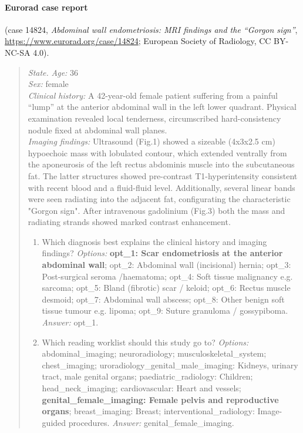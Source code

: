 \paragraph{Eurorad case report} (case 14824, \emph{Abdominal wall endometriosis: MRI findings and the “Gorgon sign”}, \url{https://www.eurorad.org/case/14824}; \textcopyright{} European Society of Radiology, CC BY-NC-SA 4.0).
\begin{quote}\footnotesize\raggedright
\textit{State.} \textit{Age:} 36\\ \textit{Sex:} female\\ \textit{Clinical history:} A 42-year-old female patient suffering from a painful “lump” at the anterior abdominal wall in the left lower quadrant. Physical examination revealed local tenderness, circumscribed hard-consistency nodule fixed at abdominal wall planes.\\ \textit{Imaging findings:} Ultrasound (Fig.1) showed a sizeable (4x3x2.5 cm) hypoechoic mass with lobulated contour, which extended ventrally from the aponeurosis of the left rectus abdominis muscle into the subcutaneous fat. The latter structures showed pre-contrast T1-hyperintensity consistent with recent blood and a fluid-fluid level. Additionally, several linear bands were seen radiating into the adjacent fat, configurating the characteristic "Gorgon sign". After intravenous gadolinium (Fig.3) both the mass and radiating strands showed marked contrast enhancement.
\begin{enumerate}[label=Q\arabic*.,leftmargin=2.2em,itemsep=1pt,topsep=2pt]
  \item Which diagnosis best explains the clinical history and imaging findings? \textit{Options:} \textbf{opt\_\allowbreak{}1: Scar endometriosis at the anterior abdominal wall}; opt\_\allowbreak{}2: Abdominal wall (incisional) hernia; opt\_\allowbreak{}3: Post-surgical seroma /haematoma; opt\_\allowbreak{}4: Soft tissue malignancy e.g. sarcoma; opt\_\allowbreak{}5: Bland (fibrotic) scar / keloid; opt\_\allowbreak{}6: Rectus muscle desmoid; opt\_\allowbreak{}7: Abdominal wall abscess; opt\_\allowbreak{}8: Other benign soft tissue tumour e.g. lipoma; opt\_\allowbreak{}9: Suture granuloma / gossypiboma. \textit{Answer:} opt\_1.
  \item Which reading worklist should this study go to? \textit{Options:} abdominal\_\allowbreak{}imaging; neuroradiology; musculoskeletal\_\allowbreak{}system; chest\_\allowbreak{}imaging; uroradiology\_\allowbreak{}genital\_\allowbreak{}male\_\allowbreak{}imaging: Kidneys, urinary tract, male genital organs; paediatric\_\allowbreak{}radiology: Children; head\_\allowbreak{}neck\_\allowbreak{}imaging; cardiovascular: Heart and vessels; \textbf{genital\_\allowbreak{}female\_\allowbreak{}imaging: Female pelvis and reproductive organs}; breast\_\allowbreak{}imaging: Breast; interventional\_\allowbreak{}radiology: Image-guided procedures. \textit{Answer:} genital\_female\_imaging.
\end{enumerate}
\end{quote}

